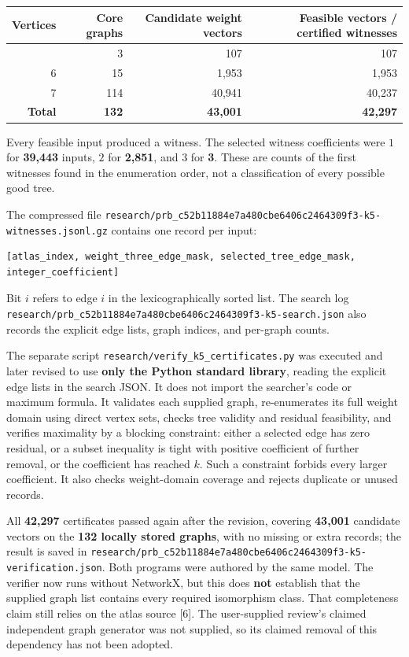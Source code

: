 \documentclass{article}
\begin{document}
\begin{longtable}[]{@{}rrrr@{}}
\toprule
Vertices
 & Core graphs
 & Candidate weight vectors
 & Feasible vectors / certified witnesses
 \\
\midrule
\endhead
\bottomrule
\endlastfoot
5 & 3 & 107 & 107 \\
6 & 15 & 1,953 & 1,953 \\
7 & 114 & 40,941 & 40,237 \\
\textbf{Total} & \textbf{132} & \textbf{43,001} & \textbf{42,297} \\
\end{longtable}

Every feasible input produced a witness. The selected witness coefficients were \(1\) for \textbf{39,443} inputs, \(2\) for \textbf{2,851}, and \(3\) for \textbf{3}. These are counts of the first witnesses found in the enumeration order, not a classification of every possible good tree.

The compressed file \texttt{research/prb_c52b11884e7a480cbe6406c2464309f3-k5-witnesses.jsonl.gz} contains one record per input:

\begin{verbatim}
[atlas_index, weight_three_edge_mask, selected_tree_edge_mask, integer_coefficient]
\end{verbatim}

Bit \(i\) refers to edge \(i\) in the lexicographically sorted list. The search log \texttt{research/prb_c52b11884e7a480cbe6406c2464309f3-k5-search.json} also records the explicit edge lists, graph indices, and per-graph counts.

The separate script \texttt{research/verify\_k5\_certificates.py} was executed and later revised to use \textbf{only the Python standard library}, reading the explicit edge lists in the search JSON. It does not import the searcher's code or maximum formula. It validates each supplied graph, re-enumerates its full weight domain using direct vertex sets, checks tree validity and residual feasibility, and verifies maximality by a blocking constraint: either a selected edge has zero residual, or a subset inequality is tight with positive coefficient of further removal, or the coefficient has reached \(k\). Such a constraint forbids every larger coefficient. It also checks weight-domain coverage and rejects duplicate or unused records.

All \textbf{42,297} certificates passed again after the revision, covering \textbf{43,001} candidate vectors on the \textbf{132 locally stored graphs}, with no missing or extra records; the result is saved in \texttt{research/prb_c52b11884e7a480cbe6406c2464309f3-k5-verification.json}. Both programs were authored by the same model. The verifier now runs without NetworkX, but this does \textbf{not} establish that the supplied graph list contains every required isomorphism class. That completeness claim still relies on the atlas source [6]. The user-supplied review's claimed independent graph generator was not supplied, so its claimed removal of this dependency has not been adopted.
\end{document}
